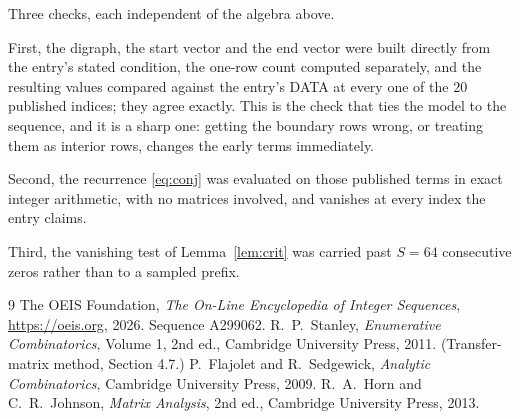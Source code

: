 \documentclass[11pt,a4paper]{article}
\theoremstyle{plain}
\theoremstyle{definition}
\begin{document}
Three checks, each independent of the algebra above.

First, the digraph, the start vector and the end vector were built directly from the
entry's stated condition, the one-row count computed separately, and the resulting values
compared against the entry's DATA at every one of the $20$ published indices; they
agree exactly. This is the check that ties the model to the sequence, and it is a sharp one:
getting the boundary rows wrong, or treating them as interior rows, changes the early terms
immediately.

Second, the recurrence \eqref{eq:conj} was evaluated on those published terms in exact
integer arithmetic, with no matrices involved, and vanishes at every index the entry claims.

Third, the vanishing test of Lemma~\ref{lem:crit} was carried past $S=64$ consecutive
zeros rather than to a sampled prefix.

\begin{thebibliography}{9}
 The OEIS Foundation, \emph{The On-Line Encyclopedia of Integer
Sequences}, \url{https://oeis.org}, 2026. Sequence A299062.
 R.~P.~Stanley, \emph{Enumerative Combinatorics}, Volume 1, 2nd ed.,
Cambridge University Press, 2011. (Transfer-matrix method, Section 4.7.)
 P.~Flajolet and R.~Sedgewick, \emph{Analytic Combinatorics}, Cambridge
University Press, 2009.
 R.~A.~Horn and C.~R.~Johnson, \emph{Matrix Analysis}, 2nd ed., Cambridge
University Press, 2013.
\end{thebibliography}
\end{document}

